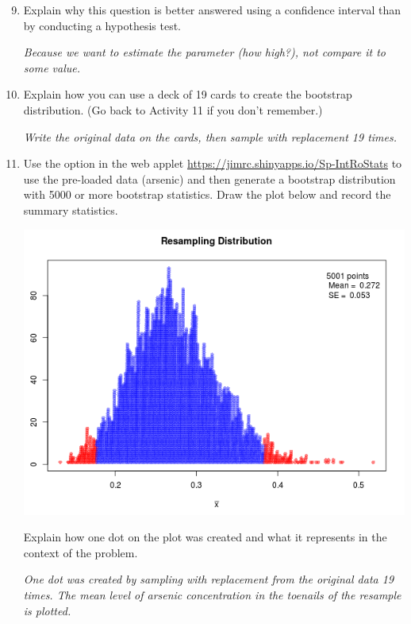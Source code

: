\begin{enumerate}
 \setcounter{enumi}{8}
\item  Explain why this question is better answered using a confidence
  interval than by conducting a hypothesis test. 
\begin{students}
  \vspace{1cm}
\end{students}
\begin{key}
  {\it  Because we want to estimate the parameter (how high?), not
    compare it to some value.}
\end{key}

\item  Explain how you can use a deck of 19 cards to create the
  bootstrap distribution. (Go back to Activity 11 if you don't remember.)
\begin{students}
  \vspace{1cm}
\end{students}
\begin{key}
  {\it Write the original data on the cards, then sample with replacement 19
    times.}
\end{key}

\item Use the  option in the web applet
  \url{https://jimrc.shinyapps.io/Sp-IntRoStats} to use the pre-loaded
  data (arsenic) and then generate a bootstrap distribution with 5000
  or more bootstrap statistics.  Draw the plot below and record the
  summary statistics.  %
\begin{students}
  \vspace{4cm}
\end{students}
\begin{key}
  {\it \includegraphics[width=.5\linewidth]{../plots/arsenicCIplot.png}}
\end{key}

Explain how one dot on the plot was created and what it represents in
the context of the problem.
\begin{students}
  \vspace{1cm}
\end{students}
\begin{key}
  {\it One dot was created by sampling with replacement from the
    original data 19 times.  The mean level of arsenic concentration
    in the toenails of the resample is plotted.}
\end{key}


\end{enumerate}
